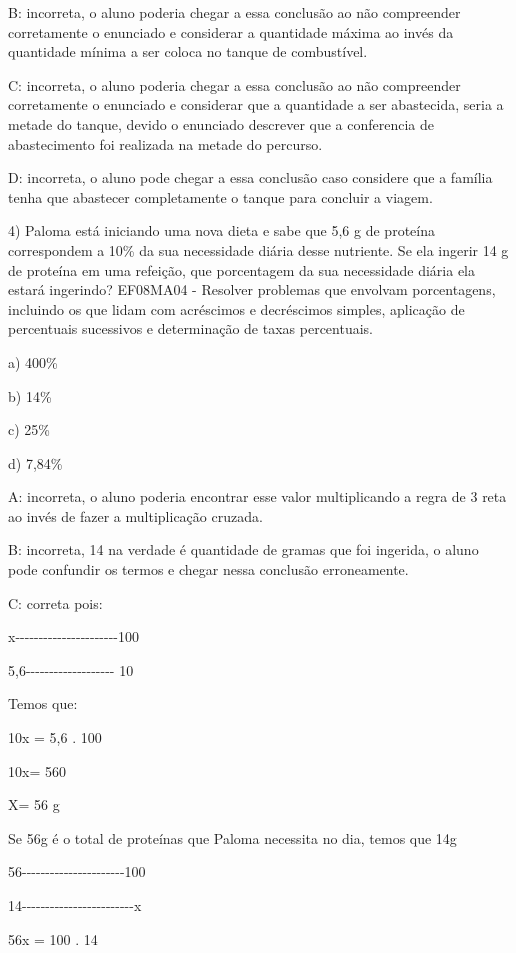 {B: incorreta, o aluno poderia chegar a essa conclusão ao não compreender
corretamente o enunciado e considerar a quantidade máxima ao invés da
quantidade mínima a ser coloca no tanque de combustível.

C: incorreta, o aluno poderia chegar a essa conclusão ao não compreender
corretamente o enunciado e considerar que a quantidade a ser abastecida,
seria a metade do tanque, devido o enunciado descrever que a conferencia
de abastecimento foi realizada na metade do percurso.

D: incorreta, o aluno pode chegar a essa conclusão caso considere que a
família tenha que abastecer completamente o tanque para concluir a
viagem.

4) Paloma está iniciando uma nova dieta e sabe que 5,6 g de proteína
correspondem a 10\% da sua necessidade diária desse nutriente. Se ela
ingerir 14 g de proteína em uma refeição, que porcentagem da sua
necessidade diária ela estará ingerindo? EF08MA04 - Resolver problemas
que envolvam porcentagens, incluindo os que lidam com acréscimos e
decréscimos simples, aplicação de percentuais sucessivos e determinação
de taxas percentuais.

a) 400\%

b) 14\%

c) 25\%

d) 7,84\%

A: incorreta, o aluno poderia encontrar esse valor multiplicando a regra
de 3 reta ao invés de fazer a multiplicação cruzada.

B: incorreta, 14 na verdade é quantidade de gramas que foi ingerida, o
aluno pode confundir os termos e chegar nessa conclusão erroneamente.

C: correta pois:

x-\/-\/-\/-\/-\/-\/-\/-\/-\/-\/-\/-\/-\/-\/-\/-\/-\/-\/-\/-\/-\/-100

5,6-\/-\/-\/-\/-\/-\/-\/-\/-\/-\/-\/-\/-\/-\/-\/-\/-\/-\/- 10

Temos que:

10x = 5,6 . 100

10x= 560

X= 56 g

Se 56g é o total de proteínas que Paloma necessita no dia, temos que 14g

56-\/-\/-\/-\/-\/-\/-\/-\/-\/-\/-\/-\/-\/-\/-\/-\/-\/-\/-\/-\/-\/-100

14-\/-\/-\/-\/-\/-\/-\/-\/-\/-\/-\/-\/-\/-\/-\/-\/-\/-\/-\/-\/-\/-\/-\/-x

56x = 100 . 14

}
